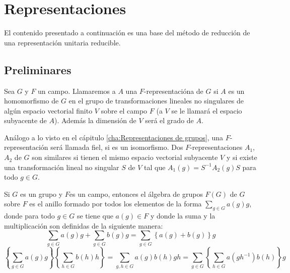 \documentclass[12pt]{book}
\theoremstyle{definition}
\newcounter{in}
\newcounter{ini}
\newcommand{\rep}{A}
\begin{document}
\chapter{Representaciones}
\label{cha:Representaciones}

El contenido presentado a continuación es una base del método de
reducción de una representación unitaria reducible.

\section{Preliminares}
\label{sec:preliminares}
Sea $G$ y $F$ un campo. Llamaremos a $\rep$ una
$F$-representacióna de $G$ si $\rep$ es un homomorfismo de $G$
en el grupo de transformaciones lineales no singulares de algún
espacio vectorial finito $V$ sobre el campo $F$ (a $V$ se le llamará
el espacio subyacente de $\rep$). Además la dimensión de $V$
será el grado de $\rep$.

Análogo a lo visto en el cápitulo \ref{cha:Representaciones de
  grupos}, una $F$-representación será llamada fiel, si es un
isomorfismo. Dos $F$-representaciones $\rep_{1}$,
$\rep_{2}$ de $G$ son similares si tienen el mismo espacio
vectorial subyacente $V$ y si existe una transformación lineal no
singular $S$ de $V$ tal que
$\rep_{1}(g)=S^{-1} \rep_{2}(g)S$ para todo $g \in G$.
 
Si $G$ es un grupo y $F$es un campo, entonces el álgebra de grupos
$F(G)$ de $G$ sobre $F$ es el anillo formado por todos los elementos
de la forma $\sum_{g \in G} a(g)g$, donde para todo $g \in G$ se tiene
que $a(g) \in F$ y donde la suma y la multiplicación son definidas de
la siguiente manera:
\begin{equation}
  \label{eq:69}
  \sum_{g \in G} a(g)g + \sum_{g \in G} b(g)g = \sum_{g \in G} \left\{ a(g) + b(g) \right\} g
\end{equation}
\begin{equation}
  \label{eq:71}
  \left\{ \sum_{g \in G} a(g)g \right\} \left\{ \sum_{h \in G} b(h)h \right\} = \sum_{g,h \in G} a(g)b(h)gh = \sum_{g \in G} \left\{ \sum_{h \in G} a(gh^{-1})b(h) \right\} g
\end{equation}
\end{document}
